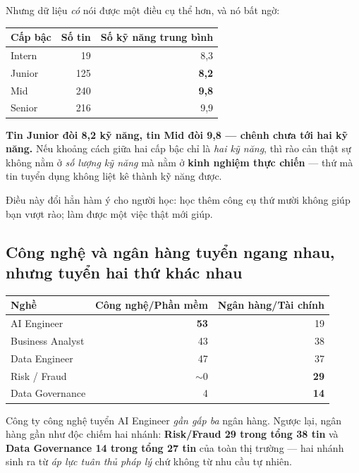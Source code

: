\documentclass[10pt]{article}
\newcommand{\keyfind}[1]{\textbf{#1}}
\begin{document}
Nhưng dữ liệu \emph{có} nói được một điều cụ thể hơn, và nó bất ngờ:

\begin{center}
\small
\begin{tabular}{lrr}
\toprule
\textbf{Cấp bậc} & \textbf{Số tin} & \textbf{Số kỹ năng trung bình} \\
\midrule
Intern & 19  & 8,3 \\
Junior & 125 & \textbf{8,2} \\
Mid    & 240 & \textbf{9,8} \\
Senior & 216 & 9,9 \\
\bottomrule
\end{tabular}
\end{center}

\keyfind{Tin Junior đòi 8,2 kỹ năng, tin Mid đòi 9,8 --- chênh chưa tới hai kỹ năng.} Nếu khoảng cách
giữa hai cấp bậc chỉ là \emph{hai kỹ năng}, thì rào cản thật sự không nằm ở \emph{số lượng kỹ năng} mà
nằm ở \textbf{kinh nghiệm thực chiến} --- thứ mà tin tuyển dụng không liệt kê thành kỹ năng được.

Điều này đổi hẳn hàm ý cho người học: học thêm công cụ thứ mười không giúp bạn vượt rào; làm được một
việc thật mới giúp.

\subsection{Công nghệ và ngân hàng tuyển ngang nhau, nhưng tuyển hai thứ khác nhau}

\begin{center}
\small
\begin{tabular}{lrr}
\toprule
\textbf{Nghề} & \textbf{Công nghệ/Phần mềm} & \textbf{Ngân hàng/Tài chính} \\
\midrule
AI Engineer       & \textbf{53} & 19 \\
Business Analyst  & 43 & 38 \\
Data Engineer     & 47 & 37 \\
Risk / Fraud      & $\sim$0 & \textbf{29} \\
Data Governance   & 4  & \textbf{14} \\
\bottomrule
\end{tabular}
\end{center}

Công ty công nghệ tuyển AI Engineer \emph{gần gấp ba} ngân hàng. Ngược lại, ngân hàng gần như độc chiếm
hai nhánh: \keyfind{Risk/Fraud 29 trong tổng 38 tin} và \keyfind{Data Governance 14 trong tổng 27 tin}
của toàn thị trường --- hai nhánh sinh ra từ \emph{áp lực tuân thủ pháp lý} chứ không từ nhu cầu tự nhiên.
\end{document}
